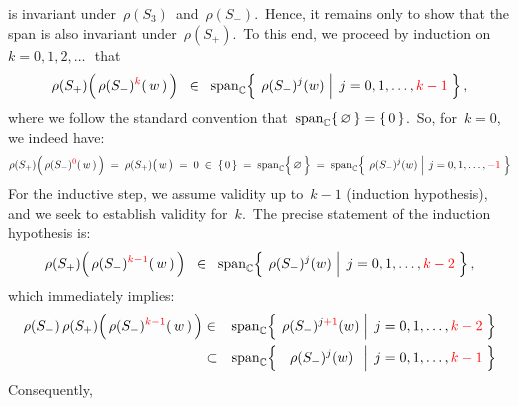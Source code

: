 is invariant under \,$\rho(S_{3})$\, and \,$\rho(S_{-})$.\,
Hence, it remains only to show that the span is also invariant under \,$\rho(S_{+})$.\,
To this end, we proceed by induction on \,$k = 0, 1, 2, \ldots\,$\, that
\begin{equation*}
\rho(S_{+})\!\left(\,\overset{{\color{white}1}}{\rho}(S_{-})^{{\color{red}k}}(\,w\,)\,\right)
\;\; \in \;\;
	\span_{\C}\!\left\{\;
		\left.
		\overset{{\color{white}1}}{\rho}(S_{-})^{j}(w)
		\;\right\vert\;
		j = 0, 1, \ldots, {\color{red}k - 1}
		\;\right\},
\end{equation*}
where we follow the standard convention that \,$\textnormal{span}_{\mathbb{C}}\{\,\varnothing\,\} = \{\,0\,\}$.\,
So, for \,$k = 0$,\, we indeed have:
\begin{equation*}
\rho(S_{+})\!\left(\,\overset{{\color{white}1}}{\rho}(S_{-})^{{\color{red}0}}(\,w\,)\,\right)
\; = \;
	\rho(S_{+})\!\left(\,\overset{{\color{white}.}}{w}\,\right)
\; = \;
	0
\; \in \;
	\{\,0\,\}
\; = \;
	\span_{\C}\!\left\{\,\overset{{\color{white}.}}{\varemptyset}\,\right\}
\; = \;
	\span_{\C}\!\left\{\;
		\left.
		\overset{{\color{white}1}}{\rho}(S_{-})^{j}(w)
		\;\right\vert\;
		j = 0, 1, \ldots, {\color{red}-1}
		\;\right\}
\end{equation*}
For the inductive step, we assume validity up to \,$k - 1$ (induction hypothesis),
and we seek to establish validity for \,$k$.\,
The precise statement of the induction hypothesis is:
\begin{equation*}
\rho(S_{+})\!\left(\,\overset{{\color{white}1}}{\rho}(S_{-})^{{\color{red}k-1}}(\,w\,)\,\right)
\;\; \in \;\;
	\span_{\C}\!\left\{\;
		\left.
		\overset{{\color{white}1}}{\rho}(S_{-})^{j}(w)
		\;\right\vert\;
		j = 0, 1, \ldots, {\color{red}k - 2}
		\;\right\},
\end{equation*}
which immediately implies:
\begin{eqnarray*}
\rho(S_{-})\,
\rho(S_{+})\!\left(\,\overset{{\color{white}1}}{\rho}(S_{-})^{{\color{red}k-1}}(\,w\,)\,\right)
& \in &
	\span_{\C}\!\left\{\;
		\left.
		\overset{{\color{white}1}}{\rho}(S_{-})^{j{\color{red}+1}}(w)
		\;\right\vert\;
		j = 0, 1, \ldots, {\color{red}k - 2}
		\;\right\}
\\
& \subset &
	\span_{\C}\!\left\{\;\;\;
		\left.
		\overset{{\color{white}1}}{\rho}(S_{-})^{j}(w)
		\;\;\,\right\vert\;
		j = 0, 1, \ldots, {\color{red}k - 1}
		\;\right\}
\end{eqnarray*}
Consequently,
